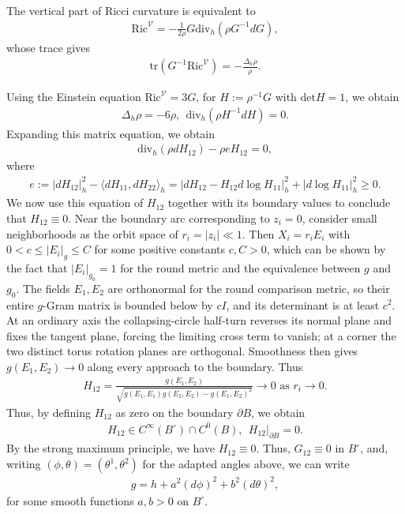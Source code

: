 \documentclass[letterpaper]{amsart}
\theoremstyle{definition}
\theoremstyle{remark}
\begin{document}
The vertical part of Ricci curvature is equivalent to
\begin{align*}
	\mathrm{Ric} ^{\mathcal{V}} = - \frac{1}{2 \rho } G \mathrm{div}_{h} \left( \rho G ^{-1} d G \right) ,
\end{align*} 
whose trace gives
\begin{align*}
	\mathrm{tr}(G ^{-1} \mathrm{Ric} ^{\mathcal{V}}) = - \frac{\Delta _h \rho }{\rho }.
\end{align*} 

Using the Einstein equation $\mathrm{Ric} ^{\mathcal{V} } = 3 G$, for $H:= \rho ^{-1}G$ with $\mathrm{det} H =1$, we obtain
\begin{align*}
	\Delta _{h} \rho = -6 \rho ,\ \ \mathrm{div}_{h}(\rho H ^{-1} d H ) =0.
\end{align*} 
Expanding this matrix equation, we obtain
\begin{align*}
	\mathrm{div}_{h}(\rho d H_{12}) - \rho e H_{12} =0,
\end{align*} 
where
\begin{align*}
	e:= |d H_{12}|^2_{h} - \langle d H_{11}, d H_{22} \rangle_{h} = |d H_{12} - H_{12} d \log H_{11}|^2_{h} + |d \log H_{11}|^2_{h} \geq 0.
\end{align*} 
We now use this equation of $H_{12}$ together with its boundary values to conclude that $H_{12} \equiv 0$. Near the boundary arc corresponding to $z_i=0$, consider small neighborhoods as the orbit space of $r_i=|z_i| \ll 1$. Then $X_i = r_i E_i$ with $0<c \leq |E_i|_g \leq C $ for some positive constants $c,C>0$, which can be shown by the fact that $|E_i|_{g_0}=1$ for the round metric and the equivalence between $g$ and $g_0$. The fields $E_1,E_2$ are orthonormal for the round comparison metric, so their entire $g$-Gram matrix is bounded below by $cI$, and its determinant is at least $c^2$. At an ordinary axis the collapsing-circle half-turn reverses its normal plane and fixes the tangent plane, forcing the limiting cross term to vanish; at a corner the two distinct torus rotation planes are orthogonal. Smoothness then gives $g(E_1,E_2)\to0$ along every approach to the boundary. Thus
\begin{align*}
	H_{12} = \frac{g(E_1, E_2)}{\sqrt{g(E_1, E_1) g(E_2, E_2) - g(E_1, E_2) ^2} } \to 0 \text{ as } r_i\to 0.
\end{align*} 
Thus, by defining $H_{12}$ as zero on the boundary $\partial B$, we obtain
\begin{align*}
	H_{12} \in C^{\infty}(B ^{\circ}) \cap C ^{0}(B) ,\ \ H_{12}|_{\partial B} =0.
\end{align*} 
By the strong maximum principle, we have $H_{12} \equiv 0$. Thus, $G_{12} \equiv 0$ in $B ^{\circ}$, and, writing $(\phi,\theta)=(\theta^1,\theta^2)$ for the adapted angles above, we can write
\begin{align*}
	g = h + a ^2 (d \phi )^2 + b ^2 (d \theta )^2,
\end{align*} 
for some smooth functions $a, b>0$ on $B ^{\circ}$.
\end{document}
